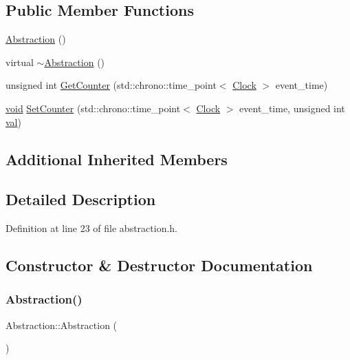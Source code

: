 \subsection*{Public Member Functions}
\begin{DoxyCompactItemize}
\item 
\mbox{\hyperlink{class_abstraction_af4bf8b0e2bfd07d50ffc28b98f35b2ee}{Abstraction}} ()
\item 
virtual \mbox{\hyperlink{class_abstraction_aaf7d34417ea08792cc2b9449f9bfdc8e}{$\sim$\+Abstraction}} ()
\item 
unsigned int \mbox{\hyperlink{class_abstraction_a2b5e781d95a843a67db307b431f419a7}{Get\+Counter}} (std\+::chrono\+::time\+\_\+point$<$ \mbox{\hyperlink{universe_8h_a0ef8d951d1ca5ab3cfaf7ab4c7a6fd80}{Clock}} $>$ event\+\_\+time)
\item 
\mbox{\hyperlink{glad_8h_a950fc91edb4504f62f1c577bf4727c29}{void}} \mbox{\hyperlink{class_abstraction_a82cd32bf3de41f35ab76d80611fe6763}{Set\+Counter}} (std\+::chrono\+::time\+\_\+point$<$ \mbox{\hyperlink{universe_8h_a0ef8d951d1ca5ab3cfaf7ab4c7a6fd80}{Clock}} $>$ event\+\_\+time, unsigned int \mbox{\hyperlink{glad_8h_a26942fd2ed566ef553eae82d2c109c8f}{val}})
\end{DoxyCompactItemize}
\subsection*{Additional Inherited Members}


\subsection{Detailed Description}


Definition at line 23 of file abstraction.\+h.



\subsection{Constructor \& Destructor Documentation}
\mbox{\label{class_abstraction_af4bf8b0e2bfd07d50ffc28b98f35b2ee}} 
\subsubsection{\texorpdfstring{Abstraction()}{Abstraction()}}
{\footnotesize\ttfamily Abstraction\+::\+Abstraction (\begin{DoxyParamCaption}{ }\end{DoxyParamCaption})}

